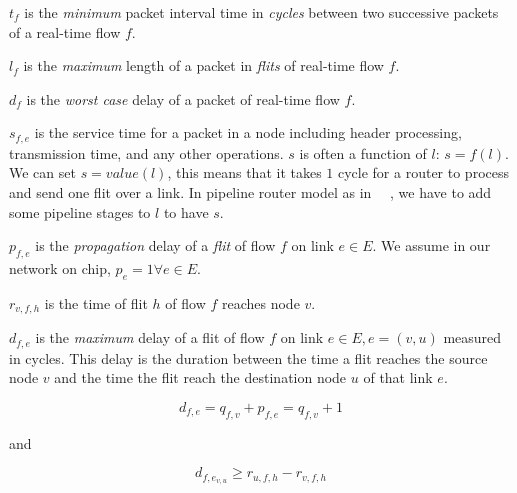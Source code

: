 \documentclass[conference, twocolumn]{IEEEtran}
\theoremstyle{definition}
\begin{document}

$t_f$ is the {\em minimum} packet interval time in {\em cycles} between
two successive packets of a real-time flow $f$.

$l_f$ is the {\em maximum} length of a packet in {\em flits} of real-time
flow $f$.

$d_f$ is the {\em worst case} delay of a packet of real-time flow $f$.

$s_{f,e}$ is the service time for a packet in a node including header 
processing, transmission time, and any other operations. $s$ is often a 
function of $l$: $s=f(l)$. We can set $s=value(l)$, this means that it takes $1$
cycle for a router to process and send one flit over a link. In pipeline router
model as in ~\cite{PehDelayModel}~\cite{PehSpecPipeR}, we have to add some
pipeline stages to $l$ to have $s$.
 
$p_{f,e}$ is the {\em propagation} delay of a {\em flit} of flow $f$ on link $e
\in E$. We assume in our network on chip, $p_e=1 \forall e \in E$.

$r_{v,f,h}$ is the time of flit $h$ of flow $f$ reaches node $v$.  

$d_{f,e}$ is the {\em maximum} delay of a flit of flow $f$ on link $e \in E,
e=(v,u)$ measured in cycles. This delay is the duration between the time a flit
reaches the source node $v$ and the time the flit reach the destination node
$u$ of that link $e$.

\begin{equation}\label{equ:edgeDelay}
d_{f,e} = q_{f,v} + p_{f,e} = q_{f,v} + 1 
\end{equation}

and

\begin{equation} 
d_{f,e_{v,u}} \geq r_{u,f,h} - r_{v,f,h}
\end{equation}



\end{document}
